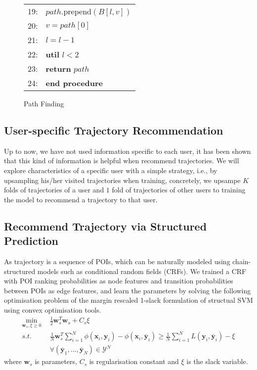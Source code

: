 \begin{figure}
\begin{tabular}{p{3pt}l}
19:&\hspace{20pt}     $path$.prepend$(B[l, v])$ \\
20:&\hspace{20pt}     $v = path[0]$ \\
21:&\hspace{20pt}     $l = l - 1$ \\
22:&\hspace{10pt} \textbf{util} $l < 2$ \\
23:&\hspace{10pt} \textbf{return} $path$ \\
24:&\textbf{end procedure} \\
\end{tabular}
\caption{Path Finding}
\label{fig:path}
\end{figure}


\subsection{User-specific Trajectory Recommendation}
\label{method:specific}
Up to now, we have not used information specific to each user, 
it has been shown that this kind of information is helpful when recommend trajectories\cite{ijcai15}.
We will explore characteristics of a specific user with a simple strategy, 
i.e., by upsampling his/her visited trajectories when training,
concretely, we upsampe $K$ folds of trajectories of a user and $1$ fold of trajectories of other users to training 
the model to recommend a trajectory to that user.


\subsection{Recommend Trajectory via Structured Prediction}
\label{method:structured}
As trajectory is a sequence of POIs, 
which can be naturally modeled using chain-structured models such as conditional random fields (CRFs)\cite{crf01}.
We trained a CRF with POI ranking probabilities as node features and transition probabilities between POIs as edge features,
and learn the parameters by solving the following optimisation problem of the margin rescaled
1-slack formulation of structual SVM\cite{ssvm09} using convex optimisation tools.
\begin{align*}
\min_{\mathbf{w}_s, \xi \ge 0} ~~& \frac{1}{2} \mathbf{w}_s^T \mathbf{w}_s + C_s \xi \\
s.t. ~~& \frac{1}{N} \mathbf{w}_s^T \sum_{i=1}^N \phi(\mathbf{x}_i, \mathbf{y}_i) - \phi(\mathbf{x}_i, \bar{\mathbf{y}}_i) \ge 
         \frac{1}{N} \sum_{i=1}^N L(\mathbf{y}_i, \bar{\mathbf{y}}_i) - \xi \\
     ~~& \forall(\bar{\mathbf{y}}_1, \dots, \bar{\mathbf{y}}_N) \in \mathcal{Y}^N
\end{align*}
where $\mathbf{w}_s$ is parameters, $C_s$ is regularisation constant and $\xi$ is the slack variable.
